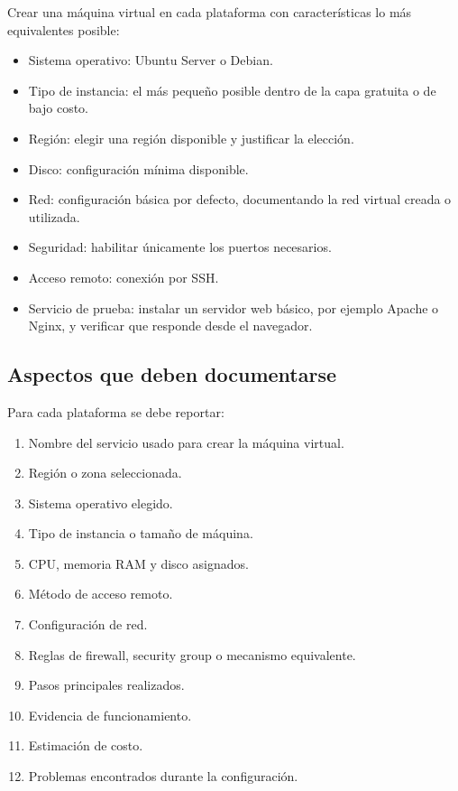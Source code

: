 \documentclass[
  coursetitle={Cómputo Nube y Tecnologías Emergentes},
  coursehours={96},
  coursedate={Verano 2026},
  doctype={Tarea 1},
  otherlangs={english,french},
  authorname={Lázaro},
  authorsurname={Bustio-Martínez},
  authortitle={PhD},
  role={Profesor Investigador},
  email={lbustio@inaoe.mx},
  phone={5559504000},
  ext={7459},
  institution={Instituto Nacional de Astrofísica, Óptica y Electrónica (INAOE)},
  department={Maestría en Ciencias en Tecnologías de Seguridad},
  address={Luis Enrique Erro 1, Sta. Ma. Tonantzintla, San Andrés Cholula, CP 72840, Puebla, México},
  margin={0.5in}
]{lbustio_lecture_notes}
\begin{document}
Crear una máquina virtual en cada plataforma con características lo más equivalentes posible:

\begin{itemize}
  \item Sistema operativo: Ubuntu Server o Debian.
  \item Tipo de instancia: el más pequeño posible dentro de la capa gratuita o de bajo costo.
  \item Región: elegir una región disponible y justificar la elección.
  \item Disco: configuración mínima disponible.
  \item Red: configuración básica por defecto, documentando la red virtual creada o utilizada.
  \item Seguridad: habilitar únicamente los puertos necesarios.
  \item Acceso remoto: conexión por SSH.
  \item Servicio de prueba: instalar un servidor web básico, por ejemplo Apache o Nginx, y verificar que responde desde el navegador.
\end{itemize}

\subsection{Aspectos que deben documentarse}
\label{sec:tarea1-aspectos}

Para cada plataforma se debe reportar:

\begin{enumerate}
  \item Nombre del servicio usado para crear la máquina virtual.
  \item Región o zona seleccionada.
  \item Sistema operativo elegido.
  \item Tipo de instancia o tamaño de máquina.
  \item CPU, memoria RAM y disco asignados.
  \item Método de acceso remoto.
  \item Configuración de red.
  \item Reglas de firewall, security group o mecanismo equivalente.
  \item Pasos principales realizados.
  \item Evidencia de funcionamiento.
  \item Estimación de costo.
  \item Problemas encontrados durante la configuración.
\end{enumerate}
\end{document}
